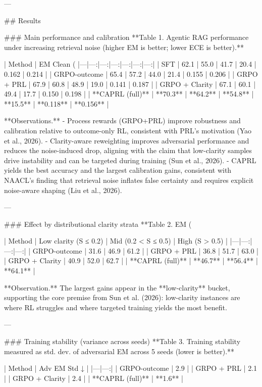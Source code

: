 ---

## Results  

### Main performance and calibration  
**Table 1. Agentic RAG performance under increasing retrieval noise (higher EM is better; lower ECE is better).**

| Method | EM Clean (%
|---|---:|---:|---:|---:|---:|---:|
| SFT | 62.1 | 55.0 | 41.7 | 20.4 | 0.162 | 0.214 |
| GRPO-outcome | 65.4 | 57.2 | 44.0 | 21.4 | 0.155 | 0.206 |
| GRPO + PRL | 67.9 | 60.8 | 48.9 | 19.0 | 0.141 | 0.187 |
| GRPO + Clarity | 67.1 | 60.1 | 49.4 | 17.7 | 0.150 | 0.198 |
| **CAPRL (full)** | **70.3** | **64.2** | **54.8** | **15.5** | **0.118** | **0.156** |

**Observations.**  
- Process rewards (GRPO+PRL) improve robustness and calibration relative to outcome-only RL, consistent with PRL’s motivation (Yao et al., 2026).  
- Clarity-aware reweighting improves adversarial performance and reduces the noise-induced drop, aligning with the claim that low-clarity samples drive instability and can be targeted during training (Sun et al., 2026).  
- CAPRL yields the best accuracy and the largest calibration gains, consistent with NAACL’s finding that retrieval noise inflates false certainty and requires explicit noise-aware shaping (Liu et al., 2026).

---

### Effect by distributional clarity strata  
**Table 2. EM (%

| Method | Low clarity (S ≤ 0.2) | Mid (0.2 < S ≤ 0.5) | High (S > 0.5) |
|---|---:|---:|---:|
| GRPO-outcome | 31.6 | 46.9 | 61.2 |
| GRPO + PRL | 36.8 | 51.7 | 63.0 |
| GRPO + Clarity | 40.9 | 52.0 | 62.7 |
| **CAPRL (full)** | **46.7** | **56.4** | **64.1** |

**Observation.** The largest gains appear in the **low-clarity** bucket, supporting the core premise from Sun et al. (2026): low-clarity instances are where RL struggles and where targeted training yields the most benefit.

---

### Training stability (variance across seeds)  
**Table 3. Training stability measured as std. dev. of adversarial EM across 5 seeds (lower is better).**

| Method | Adv EM Std ↓ |
|---|---:|
| GRPO-outcome | 2.9 |
| GRPO + PRL | 2.1 |
| GRPO + Clarity | 2.4 |
| **CAPRL (full)** | **1.6** |

